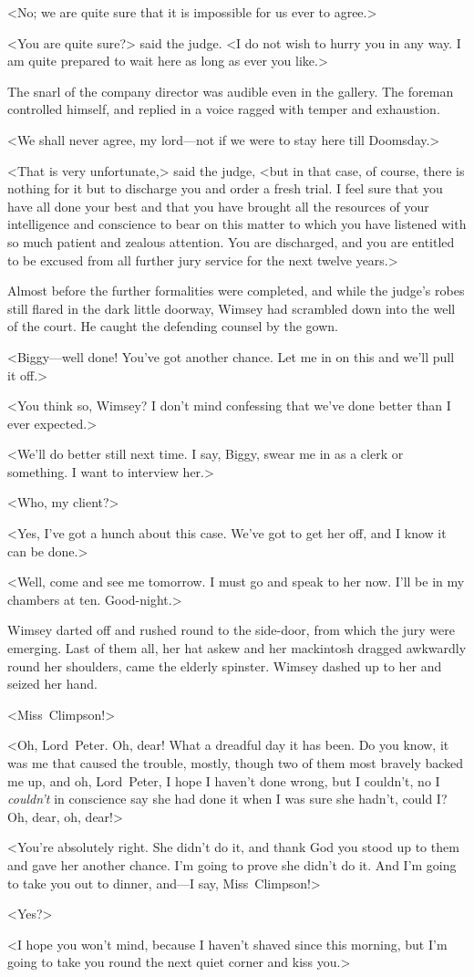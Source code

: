 <No; we are quite sure that it is impossible for us ever to agree.>

<You are quite sure?> said the judge. <I do not wish to hurry you in any way. I am quite prepared to wait here as long as ever you like.>

The snarl of the company director was audible even in the gallery. The foreman controlled himself, and replied in a voice ragged with temper and exhaustion.

<We shall never agree, my lord—not if we were to stay here till Doomsday.>

<That is very unfortunate,> said the judge, <but in that case, of course, there is nothing for it but to discharge you and order a fresh trial. I feel sure that you have all done your best and that you have brought all the resources of your intelligence and conscience to bear on this matter to which you have listened with so much patient and zealous attention. You are discharged, and you are entitled to be excused from all further jury service for the next twelve years.>

Almost before the further formalities were completed, and while the judge's robes still flared in the dark little doorway, Wimsey had scrambled down into the well of the court. He caught the defending counsel by the gown.

<Biggy—well done! You've got another chance. Let me in on this and we'll pull it off.>

<You think so, Wimsey? I don't mind confessing that we've done better than I ever expected.>

<We'll do better still next time. I say, Biggy, swear me in as a clerk or something. I want to interview her.>

<Who, my client?>

<Yes, I've got a hunch about this case. We've got to get her off, and I know it can be done.>

<Well, come and see me tomorrow. I must go and speak to her now. I'll be in my chambers at ten. Good-night.>

Wimsey darted off and rushed round to the side-door, from which the jury were emerging. Last of them all, her hat askew and her mackintosh dragged awkwardly round her shoulders, came the elderly spinster. Wimsey dashed up to her and seized her hand.

<Miss~Climpson!>

<Oh, Lord~Peter. Oh, dear! What a dreadful day it has been. Do you know, it was me that caused the trouble, mostly, though two of them most bravely backed me up, and oh, Lord~Peter, I hope I haven't done wrong, but I couldn't, no I \emph{couldn't} in conscience say she had done it when I was sure she hadn't, could I? Oh, dear, oh, dear!>

<You're absolutely right. She didn't do it, and thank God you stood up to them and gave her another chance. I'm going to prove she didn't do it. And I'm going to take you out to dinner, and—I say, Miss~Climpson!>

<Yes?>

<I hope you won't mind, because I haven't shaved since this morning, but I'm going to take you round the next quiet corner and kiss you.>